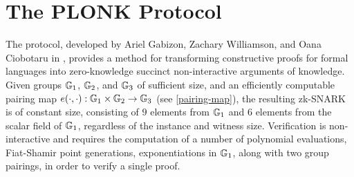 \begin{comment}
Dave thinks he can outsmart the system, Since he is the last to contribute, he just makes up an entirely new $MPC$ that does not contain any randomness from the previous contributors. He thinks he can do that because, no one can distinguish his $MPC_{1,3}$ from a correct one. If this is done in a smart way, he will even be able to compute the correct $POK$s. 

So Dave choses $s=12$, $\alpha=11$ and $\beta=10$ and he will keep those values, hoping to be able to use them later to forge false proofs in the factorization snark. He then compute  
$$
MPC_{1,3}= \left\{
\begin{array}{lcl}
([s]g_1, [s]g_2) &=& ((13,28),(7v^2,27v^3))\\ 
{}[s^2] g_1 &=& (13,15)\\
{}[\alpha]g_1 &=& (33,9)\\ 
{}[\alpha\cdot s]g_1 &=& (33,34)\\ 
([\beta]g_1,[\beta]g_2) &=& ((38,28),(42v^2,27v^3))\\ 
{}[\beta \cdot s]g_1 &=& (38,15)
\end{array}
\right\}
$$
Dave does not delete $s$, $\alpha$ and $\beta$, because if this is accepted as phase one of the \concept{Common Reference String} computation, Dave controls already $3/4$-th of the cheating key to forge proofs. So Dave is careful to get the proofs of knowledge right. He computes the transcript of Carols contribution as 

\begin{multline*}
transcript_{1,2}=\\ 
MD5('
(26,34)(16v^2,28v^3)(13,28)(13,28)(26,9)(27,34)(17v^2,28v^3)(35,28)') =\\ c8e6308fffd47009f5f65e773ae4b499
\end{multline*}

We obtain that hash by computing

$printf '\%s' "(26,34)(16v^2,28v^3)(13,28)(13,28)(26,9)(27,34)(17v^2,28v^3)(35,28)" | md5sum$

\end{example}
\end{comment}
\section{The PLONK Protocol}
\label{sec:PLONK}
The  protocol, developed by Ariel Gabizon, Zachary Williamson, and Oana Ciobotaru in \cite{gabizon-19}, provides a method for transforming constructive proofs for formal languages into zero-knowledge succinct non-interactive arguments of knowledge. Given groups $\mathbb{G}_1$, $\mathbb{G}_2$, and $\mathbb{G}_3$ of sufficient size, and an efficiently computable pairing map $e(\cdot,\cdot): \mathbb{G}_1 \times \mathbb{G}_2 \to \mathbb{G}_3$ (see \ref{pairing-map}), the resulting zk-SNARK is of constant size, consisting of $9$ elements from $\mathbb{G}_1$ and $6$ elements from the scalar field of $\mathbb{G}_1$, regardless of the instance and witness size. Verification is non-interactive and requires the computation of a number of polynomial evaluations, Fiat-Shamir point generations, exponentiations in $\mathbb{G}_1$, along with two group pairings, in order to verify a single proof.

